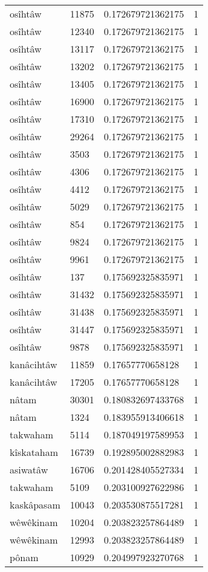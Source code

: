 \begin{longtable}{llll}
osîhtâw & 11875 & 0.172679721362175 & 1 \\
osîhtâw & 12340 & 0.172679721362175 & 1 \\
osîhtâw & 13117 & 0.172679721362175 & 1 \\
osîhtâw & 13202 & 0.172679721362175 & 1 \\
osîhtâw & 13405 & 0.172679721362175 & 1 \\
osîhtâw & 16900 & 0.172679721362175 & 1 \\
osîhtâw & 17310 & 0.172679721362175 & 1 \\
osîhtâw & 29264 & 0.172679721362175 & 1 \\
osîhtâw & 3503 & 0.172679721362175 & 1 \\
osîhtâw & 4306 & 0.172679721362175 & 1 \\
osîhtâw & 4412 & 0.172679721362175 & 1 \\
osîhtâw & 5029 & 0.172679721362175 & 1 \\
osîhtâw & 854 & 0.172679721362175 & 1 \\
osîhtâw & 9824 & 0.172679721362175 & 1 \\
osîhtâw & 9961 & 0.172679721362175 & 1 \\
osîhtâw & 137 & 0.175692325835971 & 1 \\
osîhtâw & 31432 & 0.175692325835971 & 1 \\
osîhtâw & 31438 & 0.175692325835971 & 1 \\
osîhtâw & 31447 & 0.175692325835971 & 1 \\
osîhtâw & 9878 & 0.175692325835971 & 1 \\
kanâcihtâw & 11859 & 0.17657770658128 & 1 \\
kanâcihtâw & 17205 & 0.17657770658128 & 1 \\
nâtam & 30301 & 0.180832697433768 & 1 \\
nâtam & 1324 & 0.183955913406618 & 1 \\
takwaham & 5114 & 0.187049197589953 & 1 \\
kîskataham & 16739 & 0.192895002882983 & 1 \\
asiwatâw & 16706 & 0.201428405527334 & 1 \\
takwaham & 5109 & 0.203100927622986 & 1 \\
kaskâpasam & 10043 & 0.203530875517281 & 1 \\
wêwêkinam & 10204 & 0.203823257864489 & 1 \\
wêwêkinam & 12993 & 0.203823257864489 & 1 \\
pônam & 10929 & 0.204997923270768 & 1 \\

\end{longtable}
